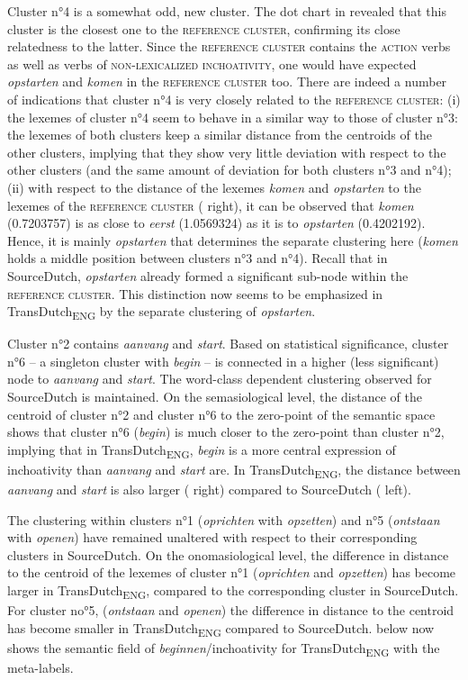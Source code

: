 Cluster n°4 is a somewhat odd, new cluster. The dot chart in  revealed that this cluster is the closest one to the \textsc{reference cluster}, confirming its close relatedness to the latter. Since the \textsc{reference cluster} contains the \textsc{action} verbs as well as verbs of {\textsc{non-lexicalized inchoativity}}, one would have expected \textit{opstarten} and \textit{komen} in the \textsc{reference cluster} too. There are indeed a number of indications that cluster n°4 is very closely related to the \textsc{reference cluster}: (i) the lexemes of cluster n°4 seem to behave in a similar way to those of cluster n°3: the lexemes of both clusters keep a similar distance from the centroids of the other clusters, implying that they show very little deviation with respect to the other clusters (and the same amount of deviation for both clusters n°3 and n°4); (ii) with respect to the distance of the lexemes \textit{komen} and \textit{opstarten} to the lexemes of the \textsc{reference cluster} ( right), it can be observed that \textit{komen} (0.7203757) is as close to \textit{eerst} (1.0569324) as it is to \textit{opstarten} (0.4202192). Hence, it is mainly \textit{opstarten} that determines the separate clustering here (\textit{komen} holds a middle position between clusters n°3 and n°4). Recall that in SourceDutch, \textit{opstarten} already formed a significant sub-node within the \textsc{reference cluster}. This distinction now seems to be emphasized in TransDutch\textsubscript{ENG} by the separate clustering of \textit{opstarten}.

Cluster n°2 contains \textit{aanvang} and \textit{start}. Based on statistical significance, cluster n°6 – a singleton cluster with \textit{begin} – is connected in a higher (less significant) node to \textit{aanvang} and \textit{start}. The word-class dependent clustering observed for SourceDutch is maintained. On the semasiological level, the distance of the centroid of cluster n°2 and cluster n°6 to the zero-point of the semantic space shows that cluster n°6 (\textit{begin}) is much closer to the zero-point than cluster n°2, implying that in TransDutch\textsubscript{ENG}, \textit{begin} is a more central expression of inchoativity than \textit{aanvang} and \textit{start} are. In TransDutch\textsubscript{ENG}, the distance between \textit{aanvang} and \textit{start} is also larger ( right) compared to SourceDutch ( left).

The clustering within clusters n°1 (\textit{oprichten} with \textit{opzetten}) and n°5 (\textit{ontstaan} with \textit{openen}) have remained unaltered with respect to their corresponding clusters in SourceDutch. On the onomasiological level, the difference in distance to the centroid of the lexemes of cluster n°1 (\textit{oprichten} and \textit{opzetten}) has become larger in TransDutch\textsubscript{ENG}, compared to the corresponding cluster in SourceDutch. For cluster no°5, (\textit{ontstaan} and \textit{openen}) the difference in distance to the centroid has become smaller in TransDutch\textsubscript{ENG} compared to SourceDutch.  below now shows the semantic field of \textit{beginnen}/inchoativity for TransDutch\textsubscript{ENG} with the meta-labels.

